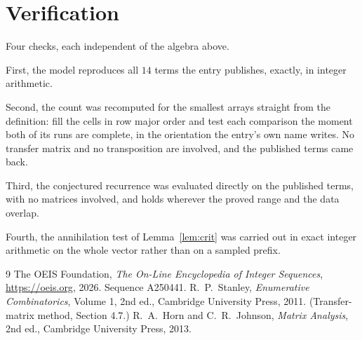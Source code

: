 \documentclass[11pt,a4paper]{article}
\theoremstyle{plain}
\theoremstyle{definition}
\begin{document}
\section{Verification}

Four checks, each independent of the algebra above.

First, the model reproduces all $14$ terms the entry publishes, exactly, in integer
arithmetic.

Second, the count was recomputed for the smallest arrays straight from the definition: fill the
cells in row major order and test each comparison the moment both of its runs are complete,
in the orientation the entry's own name writes. No transfer matrix and no transposition are
involved, and the published terms came back.

Third, the conjectured recurrence was evaluated directly on the published terms, with no
matrices involved, and holds wherever the proved range and the data overlap.

Fourth, the annihilation test of Lemma~\ref{lem:crit} was carried out in exact integer
arithmetic on the whole vector rather than on a sampled prefix.

\begin{thebibliography}{9}
 The OEIS Foundation, \emph{The On-Line Encyclopedia of Integer
Sequences}, \url{https://oeis.org}, 2026. Sequence A250441.
 R.~P.~Stanley, \emph{Enumerative Combinatorics}, Volume 1, 2nd ed.,
Cambridge University Press, 2011. (Transfer-matrix method, Section 4.7.)
 R.~A.~Horn and C.~R.~Johnson, \emph{Matrix Analysis}, 2nd ed., Cambridge
University Press, 2013.
\end{thebibliography}
\end{document}
